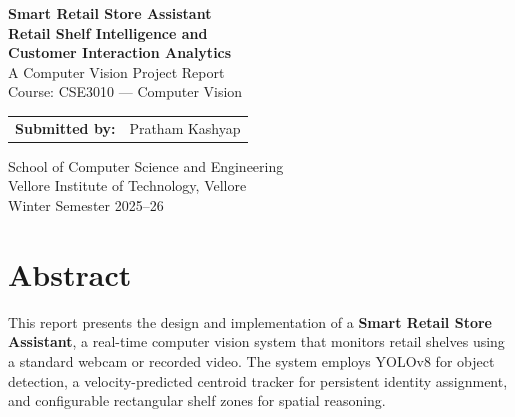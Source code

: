 \documentclass[12pt,a4paper]{article}
\begin{document}
\begin{titlepage}
    \centering
    \vspace*{2cm}
    
    {\LARGE\textbf{Smart Retail Store Assistant}}\\[0.3cm]
    {\Large\textbf{Retail Shelf Intelligence and\\Customer Interaction Analytics}}\\[1.5cm]
    
    {\large A Computer Vision Project Report}\\[0.5cm]
    {\large Course: CSE3010 — Computer Vision}\\[2cm]
    
    \begin{tabular}{rl}
        \textbf{Submitted by:} & Pratham Kashyap \\
    \end{tabular}
    
    \vfill
    
    {\large School of Computer Science and Engineering}\\[0.2cm]
    {\large Vellore Institute of Technology, Vellore}\\[0.5cm]
    {\large Winter Semester 2025--26}
    
    \vspace{1cm}
\end{titlepage}

\tableofcontents
\newpage

\section{Abstract}

This report presents the design and implementation of a \textbf{Smart Retail Store Assistant}, a real-time computer vision system that monitors retail shelves using a standard webcam or recorded video.
The system employs YOLOv8 for object detection, a velocity-predicted centroid tracker for persistent identity assignment, and configurable rectangular shelf zones for spatial reasoning.
\end{document}
